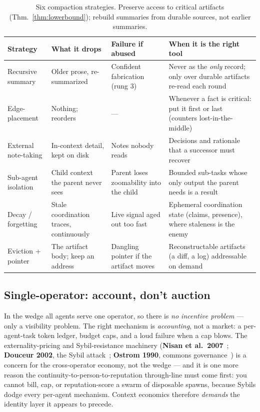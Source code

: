 \documentclass[11pt,a4paper]{article}
\theoremstyle{definition}
\theoremstyle{plain}
\begin{document}
\begin{table}[H]
\centering
\small
\renewcommand{\arraystretch}{1.3}
\begin{tabular}{@{}p{}p{}p{}p{}@{}}
\toprule
\textbf{Strategy} & \textbf{What it drops} & \textbf{Failure if abused} & \textbf{When it is the right tool} \\
\midrule
Recursive summary & Older prose, re-summarized & Confident fabrication (rung 3) & Never as the \emph{only} record; only over durable artifacts re-read each round \\
Edge-placement & Nothing; reorders & --- & Whenever a fact is critical: put it first or last (counters lost-in-the-middle) \\
External note-taking & In-context detail, kept on disk & Notes nobody reads & Decisions and rationale that a successor must recover \\
Sub-agent isolation & Child context the parent never sees & Parent loses zoomability into the child & Bounded sub-tasks whose only output the parent needs is a result \\
Decay / forgetting & Stale coordination traces, continuously & Live signal aged out too fast & Ephemeral coordination state (claims, presence), where staleness is the enemy \\
Eviction + pointer & The artifact body; keep an address & Dangling pointer if the artifact moves & Reconstructable artifacts (a diff, a log) addressable on demand \\
\bottomrule
\end{tabular}
\caption{Six compaction strategies. Preserve access to critical artifacts
(Thm.~\ref{thm:lowerbound}); rebuild summaries from durable sources, not
earlier summaries.}
\label{tab:compaction}
\end{table}

\subsection{Single-operator: account, don't auction}\label{sec:account}

In the wedge all agents serve one operator, so there is \emph{no incentive problem} ---
only a visibility problem. The right mechanism is \emph{accounting}, not a market: a
per-agent-task token ledger, budget caps, and a loud failure when a cap blows. The
externality-pricing and Sybil-resistance machinery (\textbf{Nisan et al.\
2007}~; \textbf{Douceur 2002}, the Sybil attack~;
\textbf{Ostrom 1990}, commons governance~\pdcite{ostrom1990}) is a concern for the
cross-operator economy, not the wedge --- and it is one more reason the
continuity-to-person-to-reputation through-line must come first: you cannot bill, cap,
or reputation-score a swarm of disposable spawns, because Sybils dodge every
per-agent mechanism. Context economics therefore \emph{demands} the identity layer it
appears to precede.
\end{document}
